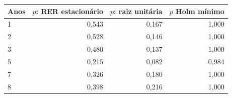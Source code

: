 \begin{tabular}{lrrr}
\toprule
Anos & $p$: RER estacionário & $p$: raiz unitária & $p$ Holm mínimo \\
\midrule
1 & 0,543 & 0,167 & 1,000 \\
2 & 0,528 & 0,146 & 1,000 \\
3 & 0,480 & 0,137 & 1,000 \\
5 & 0,215 & 0,082 & 0,984 \\
7 & 0,326 & 0,180 & 1,000 \\
8 & 0,398 & 0,216 & 1,000 \\
\bottomrule
\end{tabular}